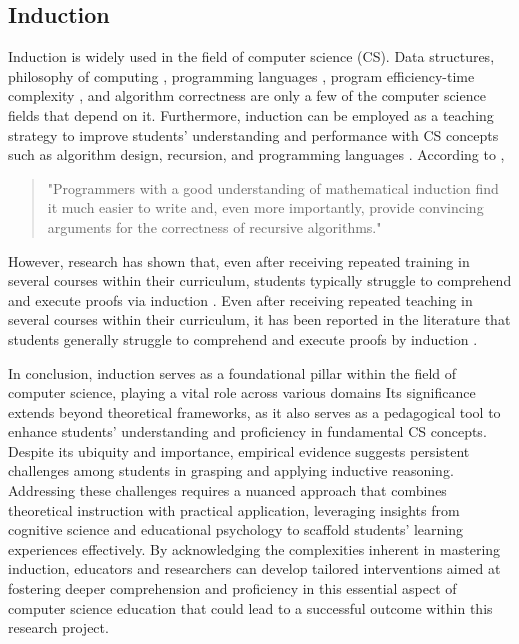 \subsection{Induction}
\par{Induction is widely used in the field of computer science (CS). Data structures, philosophy of computing \citep{lynch1996distributed,hopcroft2001introduction,barwise1998computers}, programming languages \citep{pierce2002types}, program efficiency-time complexity \citep{cormen2022introduction}, and algorithm correctness \citep{cormen2022introduction,lynch1996distributed,page2003software,weiss1998data} are only a few of the computer science fields that depend on it. Furthermore, induction can be employed as a teaching strategy to improve students' understanding and performance with CS concepts such as algorithm design, recursion, and programming languages \citep{manber1989introduction,wu1998conceptual}.  According to \cite{bruce2003math}, }
\begin{quote}
        "Programmers with a good understanding of mathematical induction find it much easier to write and, even more importantly, provide convincing arguments for the correctness of recursive algorithms."
\end{quote}
\par{However, research has shown that, even after receiving repeated training in several courses within their curriculum, students typically struggle to comprehend and execute proofs via induction \citep{lowenthal1992mathematical,movshovitz1993mathematical,baker1995characterizing,dubinsky1989teaching}. Even after receiving repeated teaching in several courses within their curriculum, it has been reported in the literature that students generally struggle to comprehend and execute proofs by induction \citep{polycarpou2008conceptual}.}
\par{In conclusion, induction serves as a foundational pillar within the field of computer science, playing a vital role across various domains Its significance extends beyond theoretical frameworks, as it also serves as a pedagogical tool to enhance students' understanding and proficiency in fundamental CS concepts. Despite its ubiquity and importance, empirical evidence suggests persistent challenges among students in grasping and applying inductive reasoning. Addressing these challenges requires a nuanced approach that combines theoretical instruction with practical application, leveraging insights from cognitive science and educational psychology to scaffold students' learning experiences effectively. By acknowledging the complexities inherent in mastering induction, educators and researchers can develop tailored interventions aimed at fostering deeper comprehension and proficiency in this essential aspect of computer science education that could lead to a successful outcome within this research project.}
